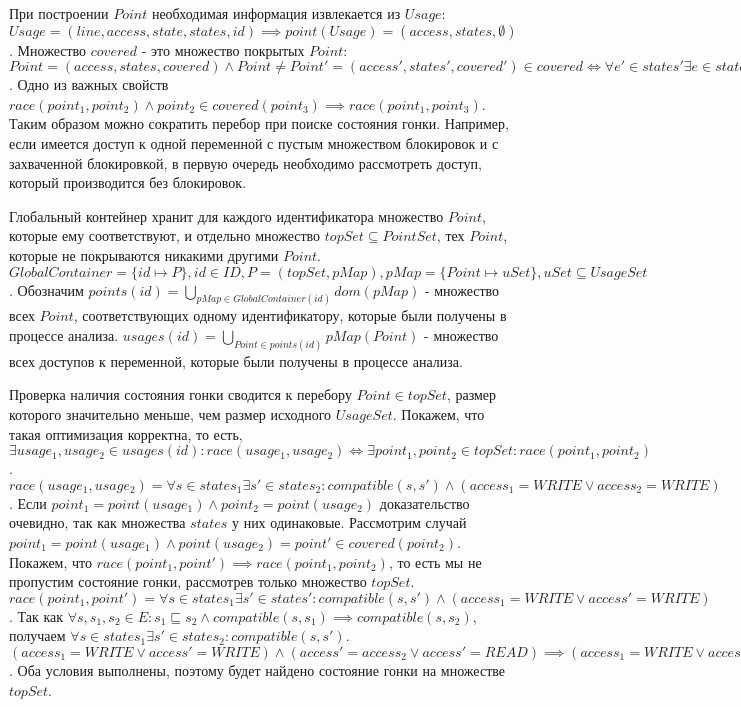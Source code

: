 При построении $Point$ необходимая информация извлекается из $Usage$: $Usage = (line, access, state, states, id) \implies point(Usage) = (access, states, \emptyset)$.
Множество $covered$ - это множество покрытых $Point$: $Point = (access, states, covered) \land Point \neq Point'=(access', states', covered') \in covered \Leftrightarrow \forall e' \in states' \exists e \in states: e' \sqsubseteq e \land (access' = access \lor access' = READ)$.
Одно из важных свойств $race(point_1, point_2) \land point_2 \in covered(point_3) \implies race(point_1, point_3)$.
Таким образом можно сократить перебор при поиске состояния гонки. 
Например, если имеется доступ к одной переменной с пустым множеством блокировок и с захваченной блокировкой, в первую очередь необходимо рассмотреть доступ, который производится без блокировок.

Глобальный контейнер хранит для каждого идентификатора множество $Point$, которые ему соответствуют, и отдельно множество $topSet \subseteq PointSet$, тех $Point$, которые не покрываются никакими другими $Point$.
$GlobalContainer = \{id \mapsto P\}, id \in ID, P = (topSet, pMap), pMap = \{Point \mapsto uSet\}, uSet \subseteq UsageSet$.
Обозначим $points(id) = \bigcup_{pMap \in GlobalContainer(id)}{dom(pMap)}$ - множество всех $Point$, соответствующих одному идентификатору, которые были получены в процессе анализа.
$usages(id) = \bigcup_{Point \in points(id)}{pMap(Point)}$ - множество всех доступов к переменной, которые были получены в процессе анализа.

Проверка наличия состояния гонки сводится к перебору $Point \in topSet$, размер которого значительно меньше, чем размер исходного $UsageSet$.
Покажем, что такая оптимизация корректна, то есть, 
$\exists usage_1, usage_2 \in usages(id): race(usage_1, usage_2) \Leftrightarrow \exists point_1, point_2 \in topSet: race(point_1, point_2)$.
$race(usage_1, usage_2) = \forall s \in states_1 \exists s' \in states_2: compatible(s, s') \land (access_1 = WRITE \lor access_2 = WRITE)$.
Если $point_1=point(usage_1) \land point_2=point(usage_2)$ доказательство очевидно, так как множества $states$ у них одинаковые.
Рассмотрим случай $point_1 =point(usage_1) \land point(usage_2) = point' \in covered(point_2)$. 
Покажем, что $race(point_1, point') \implies race(point_1, point_2)$, то есть мы не пропустим состояние гонки, рассмотрев только множество $topSet$. 
$race(point_1, point') = \forall s \in states_1 \exists s' \in states': compatible(s, s') \land (access_1 = WRITE \lor access' = WRITE)$.
Так как $\forall s, s_1, s_2 \in E: s_1 \sqsubseteq s_2 \land compatible(s, s_1) \implies compatible(s, s_2)$, получаем $\forall s \in states_1 \exists s' \in states_2: compatible(s, s')$.
$(access_1 = WRITE \lor access' = WRITE) \land (access' = access_2 \lor access' = READ) \implies (access_1 = WRITE \lor access_2 = WRITE)$.
Оба условия выполнены, поэтому будет найдено состояние гонки на множестве $topSet$. 

